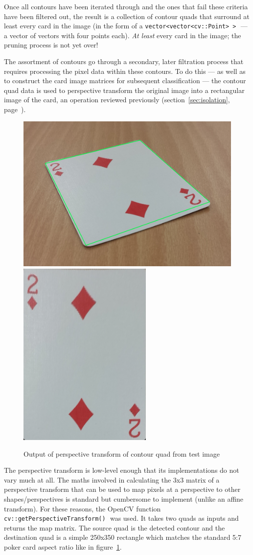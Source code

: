 \documentclass[a4paper,12pt,notitlepage]{article}
\newcommand{\secref}[1]{(section~\ref{#1}, page~\pageref{#1})}
\newcommand{\code}[1]{\colorbox{white}{\lstinline[basicstyle=\ttfamily\color{black}]|#1|} }
\begin{document}
			Once all contours have been iterated through and the ones that fail these criteria have been filtered out, the result is a collection of contour quads that surround at least every card in the image (in the form of a \code{vector<vector<cv::Point> >} --- a vector of vectors with four points each). \emph{At least} every card in the image; the pruning process is not yet over!

			The assortment of contours go through a secondary, later filtration process that requires processing the pixel data within these contours. To do this --- as well as to construct the card image matrices for subsequent classification --- the contour quad data is used to perspective transform the original image into a rectangular image of the card, an operation reviewed previously \secref{sec:isolation}.

			\begin{figure}[H]
				\centering
				\includegraphics[width=0.6\linewidth]{perstrans1}
				\includegraphics[width=0.3\linewidth]{perstrans2}
				\caption{Output of perspective transform of contour quad from test image}
				\label{fig:perstrans}
			\end{figure}

			The perspective transform is low-level enough that its implementations do not vary much at all. The maths involved in calculating the 3x3 matrix of a perspective transform that can be used to map pixels at a perspective to other shapes/perspectives is standard but cumbersome to implement (unlike an affine transform). For these reasons, the OpenCV function \code{cv::getPerspectiveTransform()} was used. It takes two quads as inputs and returns the map matrix. The source quad is the detected contour and the destination quad is a simple 250x350 rectangle which matches the standard 5:7 poker card aspect ratio like in figure~\ref{fig:perstrans}.
\end{document}
